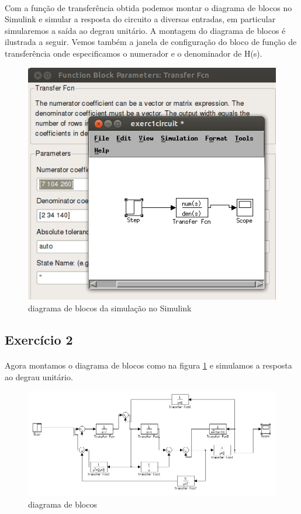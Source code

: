 \documentclass[a4paper,11pt]{article}
\begin{document}
\paragraph{}Com a função de transferência obtida podemos 
montar o diagrama de blocos no Simulink e simular a resposta
do circuito a diversas entradas, em particular simularemos 
a saída ao degrau unitário. A montagem do diagrama de blocos 
é ilustrada a seguir. Vemos também a janela de configuração
do bloco de função de transferência onde especificamos 
o numerador e o denominador de H(s).
\FloatBarrier
\begin{figure}[!htp]
		\centering
		\includegraphics[scale = 0.5]{./images/circuit1-diagrama.png}
	\caption{diagrama de blocos da simulação no Simulink}
\end{figure}
\FloatBarrier
\subsection{Exercício 2}
\paragraph{}Agora montamos o diagrama de blocos como na figura
\ref{fig:exerc2-diagram} e simulamos a resposta ao degrau unitário.
\FloatBarrier
\begin{figure}[!htp]
		\centering
		\includegraphics[scale = 0.6]{./images/exp2-circuit2-diagram.png}
	\caption{diagrama de blocos}
	\label{fig:exerc2-diagram}
\end{figure}
\FloatBarrier
\end{document}
